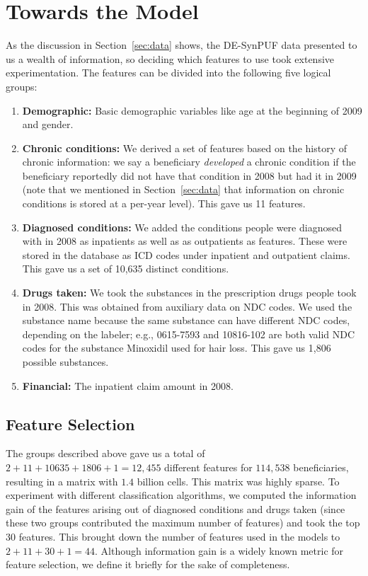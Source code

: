 \section{Towards the Model}
\label{sec:towardsmodel}
As the discussion in Section~\ref{sec:data} shows, the DE-SynPUF data presented to us a wealth of information, so deciding which features to use took extensive experimentation. The features can be divided into the following five logical groups:
\begin{enumerate}
\item {\bf Demographic: } Basic demographic variables like age at the beginning of 2009 and gender.
\item {\bf Chronic conditions: }We derived a set of features based on the history of chronic information: we say a beneficiary {\em developed} a chronic condition if the beneficiary reportedly did not have that condition in 2008 but had it in 2009 (note that we mentioned in Section~\ref{sec:data} that information on chronic conditions is stored at a per-year level). This gave us 11 features.
\item {\bf Diagnosed conditions: }We added the conditions people were diagnosed with in 2008 as inpatients as well as as outpatients as features. These were stored in the database as ICD codes under inpatient and outpatient claims. This gave us a set of 10,635 distinct conditions. 
\item {\bf Drugs taken: }We took the substances in the prescription drugs people took in 2008. This was obtained from auxiliary data on NDC codes. We used the substance name because the same substance can have different NDC codes, depending on the labeler; e.g., 0615-7593 and 10816-102 are both valid NDC codes for the substance Minoxidil used for hair loss. This gave us 1,806 possible substances.
\item {\bf Financial: } The inpatient claim amount in 2008.
\end{enumerate}

\subsection{Feature Selection}
\label{subsec:featuresel}
The groups described above gave us a total of $2 + 11 + 10635 + 1806 + 1 = 12,455$ different features for $114,538$ beneficiaries, resulting in a matrix with $1.4$ billion cells. This matrix was highly sparse. To experiment with different classification algorithms, we computed the information gain of the features arising out of diagnosed conditions and drugs taken (since these two groups contributed the maximum number of features) and took the top 30 features. This brought down the number of features used in the models to $2 + 11 + 30 + 1 = 44$. Although information gain is a widely known metric for feature selection, we define it briefly for the sake of completeness.\\

